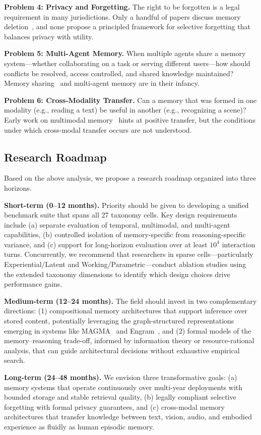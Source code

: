 \textbf{Problem 4: Privacy and Forgetting.} The right to be forgotten is a legal requirement in many jurisdictions. Only a handful of papers discuss memory deletion~\cite{Unknown2024FromIsolatedConversa,Unknown2025UnveilingPrivacyRisk}, and none propose a principled framework for selective forgetting that balances privacy with utility.

\textbf{Problem 5: Multi-Agent Memory.} When multiple agents share a memory system---whether collaborating on a task or serving different users---how should conflicts be resolved, access controlled, and shared knowledge maintained? Memory sharing~\cite{Unknown2024MemorySharingforLarg,Unknown2025Mem2Ego} and multi-agent memory are in their infancy.

\textbf{Problem 6: Cross-Modality Transfer.} Can a memory that was formed in one modality (e.g., reading a text) be useful in another (e.g., recognizing a scene)? Early work on multimodal memory~\cite{Unknown2025VisMem,Unknown2026TeleMem} hints at positive transfer, but the conditions under which cross-modal transfer occurs are not understood.

\subsection{Research Roadmap}

Based on the above analysis, we propose a research roadmap organized into three horizons.

\textbf{Short-term (0--12 months).} Priority should be given to developing a unified benchmark suite that spans all 27 taxonomy cells. Key design requirements include (a) separate evaluation of temporal, multimodal, and multi-agent capabilities, (b) controlled isolation of memory-specific from reasoning-specific variance, and (c) support for long-horizon evaluation over at least $10^4$ interaction turns. Concurrently, we recommend that researchers in sparse cells---particularly Experiential/Latent and Working/Parametric---conduct ablation studies using the extended taxonomy dimensions to identify which design choices drive performance gains.

\textbf{Medium-term (12--24 months).} The field should invest in two complementary directions: (1) compositional memory architectures that support inference over stored content, potentially leveraging the graph-structured representations emerging in systems like MAGMA~\cite{Unknown2026MAGMA} and Engram~\cite{Unknown2026Engram}, and (2) formal models of the memory--reasoning trade-off, informed by information theory or resource-rational analysis, that can guide architectural decisions without exhaustive empirical search.

\textbf{Long-term (24--48 months).} We envision three transformative goals: (a) memory systems that operate continuously over multi-year deployments with bounded storage and stable retrieval quality, (b) legally compliant selective forgetting with formal privacy guarantees, and (c) cross-modal memory architectures that transfer knowledge between text, vision, audio, and embodied experience as fluidly as human episodic memory.
